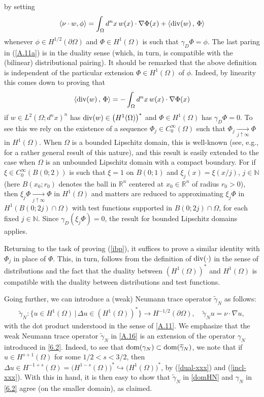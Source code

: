 \documentclass[reqno,10pt, centertags]{amsart}
\newcommand{\bbN}{{\mathbb{N}}}
\newcommand{\bbR}{{\mathbb{R}}}
\newcommand{\lb}{\label}
\newcommand{\wti}{\widetilde}
\newcommand{\ga}{\gamma}
\newcommand{\Om}{\Omega}
\newcommand{\dOm}{{\partial\Omega}}
\newcommand{\dom}{\text{\rm{dom}}}
\numberwithin{equation}{section}
\theoremstyle{definition}
\begin{document}
by setting
\begin{align}
\langle\nu\cdot
w,\phi\rangle=\int_{\Omega}d^nx\,w(x)\cdot\nabla\Phi(x) +
\langle {\rm div}(w)\,,\,\Phi\rangle
\lb{A.11a}
\end{align}
whenever $\phi\in H^{1/2}(\partial\Omega)$ and $\Phi\in
H^{1}(\Omega)$ is such that $\ga_D\Phi=\phi$. The last paring
in (\ref{A.11a}) is in the duality sense (which, in turn, is compatible
with the (bilinear) distributional pairing). It should be remarked
that the above definition is independent of the particular extension
$\Phi\in H^{1}(\Omega)$ of $\phi$. Indeed, by linearity this comes
down to proving that
\begin{equation}\label{ibp}
\langle {\rm div}(w)\,,\,\Phi\rangle
=-\int_{\Omega}d^nx\,w(x)\cdot\nabla\Phi(x)
\end{equation}
if $w\in L^2(\Omega;d^nx)^n$ has ${\rm div}(w)\in \big(H^1(\Omega)\big)^*$
and $\Phi\in H^{1}(\Omega)$ has $\ga_D\Phi=0$. To see this we rely
on the existence of a sequence $\Phi_j\in C^\infty_0(\Omega)$ such
that $\Phi_j\underset{j\uparrow\infty}{\rightarrow} \Phi$ in
$H^{1}(\Omega)$. When $\Omega$ is a bounded Lipschitz domain, this is
well-known (see, e.g., \cite[Remark 2.7]{JK95} for a rather general result
of this nature), and this result is easily extended to the case when
$\Omega$ is an unbounded Lipschitz domain with a compact boundary. For if
$\xi\in C^\infty_0(B(0;2))$ is such that $\xi= 1$ on $B(0;1)$ and
$\xi_j(x)=\xi(x/j)$, $j\in\bbN$ (here $B(x_0;r_0)$ denotes the ball in
$\bbR^n$ centered at $x_0\in\bbR^n$ of radius $r_0>0$), then
$\xi_j\Phi\underset{j\uparrow\infty}{\rightarrow}\Phi$ in
$H^{1}(\Omega)$ and matters are reduced to approximating $\xi_j\Phi$ in
$H^{1}(B(0;2j)\cap\Omega)$ with test functions supported in
$B(0;2j)\cap\Omega$, for each fixed $j\in\bbN$. Since
$\ga_D(\xi_j\Phi)=0$, the result for bounded Lipschitz domains applies.

Returning to the task of proving (\ref{ibp}), it suffices to prove a
similar identity with $\Phi_j$ in place of $\Phi$. This, in turn, follows
from the definition of ${\rm div}(\cdot)$ in the sense of distributions
and the fact that the duality between $(H^1(\Omega))^*$ and $H^1(\Omega)$
is compatible with the duality between distributions and test functions.

Going further, we can introduce a (weak) Neumann trace operator
$\wti\gamma_N$ as follows:
\begin{align}\lb{A.16}
\wti\gamma_N:\{u\in H^{1}(\Om) \,|\, \Delta u \in (H^1(\Om))^*\}\to
H^{-1/2}(\dOm),\quad \wti\gamma_N u=\nu\cdot \nabla u,
\end{align}
with the dot product  understood in the sense of \eqref{A.11}.
We emphasize that the weak Neumann trace operator $\wti\gamma_N$ in
\eqref{A.16} is an extension of the operator $\gamma_N$
introduced in \eqref{6.2}. Indeed, to see that
$\dom(\gamma_N)\subset\dom(\wti\gamma_N)$, we note that
if $u\in H^{s+1}(\Omega)$ for some $1/2<s<3/2$, then
$\Delta u\in H^{-1+s}(\Omega)=\bigl(H^{1-s}(\Omega)\bigr)^*\hookrightarrow
\bigl(H^{1}(\Omega)\bigr)^*$, by (\ref{dual-xxx}) and (\ref{incl-xxx}).
With this in hand, it is then easy to show that
$\wti\gamma_N$ in \eqref{domHN} and $\gamma_N$ in \eqref{6.2} agree
(on the smaller domain), as claimed.
\end{document}
